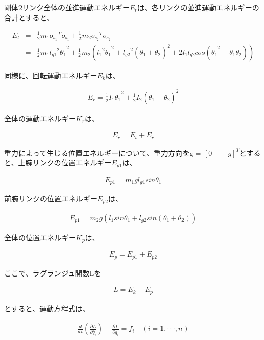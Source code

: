 剛体2リンク全体の並進運動エネルギー$E_{t}$は、各リンクの並進運動エネルギーの合計とすると、

\begin{eqnarray}
  E_{t}
  &=&\frac{1}{2}m_{1}o_{\dot{s}_{1}}{}^T\!o_{\dot{s}_{1}} + \frac{1}{2}m_{2}o_{\dot{s}_{2}}{}^T\!o_{\dot{s}_{2}} \nonumber \\
  &=&\frac{1}{2}m_{1}{l_{g1}}^2{\dot{\theta}_{1}}^2 + \frac{1}{2}m_{2}({{l_{1}}^2}{\dot{\theta}_{1}}^2 + {l_{g2}}^2(\dot{\theta}_{1} + \dot{\theta}_{2})^2 + 2{l_{1}}{l_{g2}}cos({\dot{\theta}_{1}}^2 + \dot{\theta}_{1}\dot{\theta}_{2}))
\end{eqnarray}

同様に、回転運動エネルギー$E_{k}$は、

\begin{eqnarray}
  E_{r}
  =\frac{1}{2}I_{1}{\dot{\theta}_{1}}^2 + \frac{1}{2}I_{2}(\dot{\theta}_{1} + \dot{\theta}_{2})^2
\end{eqnarray}

全体の運動エネルギー$K_{r}$は、

\begin{eqnarray}
  E_{r}
  =E_{t} + E_{r}
\end{eqnarray}

重力によって生じる位置エネルギーについて、重力方向をg = ${[0 \quad -g]}^T$とすると、上腕リンクの位置エネルギー$E_{p1}$は、

\begin{eqnarray}
  E_{p1}
  =m_{1}gl_{g1}sin\theta_{1}
\end{eqnarray}

前腕リンクの位置エネルギー$E_{p2}$は、

\begin{eqnarray}
  E_{p1}
  =m_{2}g(l_{1}sin\theta_{1} + l_{g2}sin(\theta_{1} + \theta_{2}))
\end{eqnarray}

全体の位置エネルギー$K_{p}$は、

\begin{eqnarray}
  E_{p}
  =E_{p1} + E_{p2}
\end{eqnarray}

ここで、ラグランジュ関数Lを

\begin{eqnarray}
  L
  =E_{k} - E_{p}
\end{eqnarray}

とすると、運動方程式は、

\begin{eqnarray}
  \frac{d}{dt}(\frac{\partial L}{\partial \dot{q_{i}}}) - \frac{\partial L}{\partial q_{i}} = f_{i} \quad (i = 1,\cdot\cdot\cdot, n)
\end{eqnarray}


